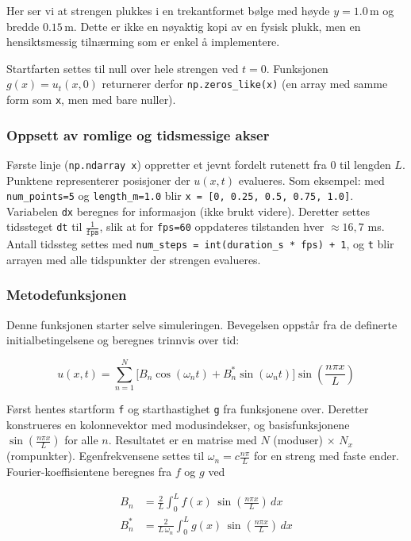 Her ser vi at strengen plukkes i en trekantformet bølge med høyde $y=1.0\,\text{m}$ og bredde $0.15\,\text{m}$.
Dette er ikke en nøyaktig kopi av en fysisk plukk, men en hensiktsmessig tilnærming som er enkel å implementere.

Startfarten settes til null over hele strengen ved $t=0$. Funksjonen $g(x)=u_t(x,0)$ returnerer derfor
\verb|np.zeros_like(x)| (en array med samme form som \verb|x|, men med bare nuller).

\subsubsection{Oppsett av romlige og tidsmessige akser}
Første linje (\verb|np.ndarray x|) oppretter et jevnt fordelt rutenett fra $0$ til lengden $L$. Punktene representerer
posisjoner der $u(x,t)$ evalueres. Som eksempel: med \verb|num_points=5| og \verb|length_m=1.0| blir \verb|x = [0, 0.25, 0.5, 0.75, 1.0]|.
Variabelen \verb|dx| beregnes for informasjon (ikke brukt videre). Deretter settes tidssteget \verb|dt| til $\tfrac{1}{\texttt{fps}}$,
slik at for \verb|fps=60| oppdateres tilstanden hver $\approx 16{,}7$ ms. Antall tidssteg settes med
\verb|num_steps = int(duration_s * fps) + 1|, og \verb|t| blir arrayen med alle tidspunkter der strengen evalueres.

\subsubsection{Metodefunksjonen}
Denne funksjonen starter selve simuleringen. Bevegelsen oppstår fra de definerte initialbetingelsene og beregnes trinnvis over tid:

\begin{equation*}
  u(x,t) = \sum_{n=1}^{N} 
  \big[ B_n \cos(\omega_n t) + B_n^{*} \sin(\omega_n t) \big]
  \sin\!\left(\frac{n\pi x}{L}\right)
\end{equation*}

Først hentes startform \verb|f| og starthastighet \verb|g| fra funksjonene over. Deretter konstrueres en kolonnevektor med
modusindekser, og basisfunksjonene $\sin\!\left(\frac{n \pi x}{L}\right)$ for alle $n$. Resultatet er en matrise med
$N$ (moduser) $\times$ $N_x$ (rompunkter). Egenfrekvensene settes til $\omega_n = c \frac{n \pi}{L}$ for en streng med faste ender.
Fourier-koeffisientene beregnes fra $f$ og $g$ ved

\begin{align*}
  B_n &= \frac{2}{L} \int_{0}^{L} f(x)\,\sin\!\left(\frac{n\pi x}{L}\right)\,dx \\
  B_n^{*} &= \frac{2}{L\,\omega_n} \int_{0}^{L} g(x)\,\sin\!\left(\frac{n\pi x}{L}\right)\,dx
\end{align*}

